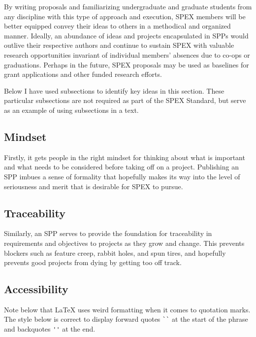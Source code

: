 \documentclass[journal]{SPEXformat}
\newenvironment{help}{
  \ttfamily\footnotesize\sloppy
  \begin{lrbox}{\helpbox}\begin{minipage}{\linewidth}
  }{
  \end{minipage}\end{lrbox}
  \ifbool{showhelp}{
    \fbox{\usebox{\helpbox}}
  }{}
}
\begin{document}
By writing proposals and familiarizing undergraduate and graduate students from any discipline with this type of approach and execution, SPEX members will be better equipped convey their ideas to others in a methodical and organized manner.
Ideally, an abundance of ideas and projects encapsulated in SPPs would outlive their respective authors and continue to sustain SPEX with valuable research opportunities invariant of individual members' absences due to co-ops or graduations.
Perhaps in the future, SPEX proposals may be used as baselines for grant applications and other funded research efforts.

\begin{help}
  Below I have used subsections to identify key ideas in this section. These particular subsections are not required as part of the SPEX Standard, but serve as an example of using subsections in a text.
\end{help}

\subsection{Mindset}
\label{subsec:mindset}
Firstly, it gets people in the right mindset for thinking about what is important and what needs to be considered before taking off on a project.
Publishing an SPP imbues a sense of formality that hopefully makes its way into the level of seriousness and merit that is desirable for SPEX to pursue.

\subsection{Traceability}
\label{subsec:traceability}
Similarly, an SPP serves to provide the foundation for traceability in requirements and objectives to projects as they grow and change.
This prevents blockers such as feature creep, rabbit holes, and spun tires, and hopefully prevents good projects from dying by getting too off track.

\subsection{Accessibility}
\label{subsec:plug-n-play}
\begin{help}
  Note below that LaTeX uses weird formatting when it comes to quotation marks.
  The style below is correct to display forward quotes \verb|``| at the start of the phrase and backquotes \verb|''| at the end.
\end{help}
\end{document}
